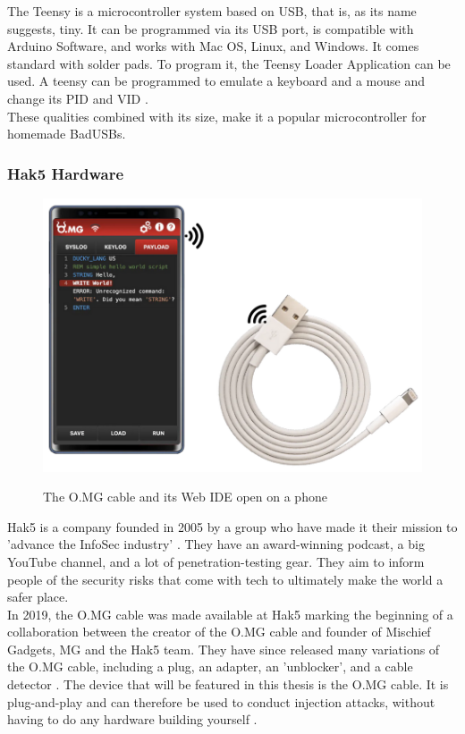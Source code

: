 The Teensy  \cite{TeensyUSBDevelopment} is a microcontroller system based on USB, that is, as its name suggests, tiny. It can be programmed via its USB port, is compatible with Arduino Software, and works with Mac OS, Linux, and Windows. It comes standard with solder pads. To program it, the Teensy Loader Application can be used.
A teensy can be programmed to emulate a keyboard and a mouse and change its PID and VID \cite{farhiMalboardNovelUser2019}.\\
These qualities combined with its size, make it a popular microcontroller for homemade BadUSBs. 


\subsubsection{Hak5 Hardware} \label{Hak5Hardware}

\begin{figure}[H]
    \centering
    \includegraphics[width=0.5\linewidth]{visuals/OMGCable.png}
    \caption{The O.MG cable and its Web IDE open on a phone}
    \label{fig:OMGCable}
    \cite{hak5MGCable}
\end{figure}

Hak5 is a company founded in 2005 by a group who have made it their mission to 'advance the InfoSec industry' \cite{hak5}. They have an award-winning podcast, a big YouTube channel, and a lot of penetration-testing gear. They aim to inform people of the security risks that come with tech to ultimately make the world a safer place. \\
In 2019, the O.MG cable was made available at Hak5 \cite{MGCable2019a} marking the beginning of a collaboration between the creator of the O.MG cable and founder of Mischief Gadgets, MG \cite{MGCable2019a} and the Hak5 team. They have since released many variations of the O.MG cable, including a plug, an adapter, an 'unblocker', and a cable detector \cite{hak5MischiefGadgets}. The device that will be featured in this thesis is the O.MG cable. It is plug-and-play and can therefore be used to conduct injection attacks, without having to do any hardware building yourself \cite{hak5MGCable}. 



